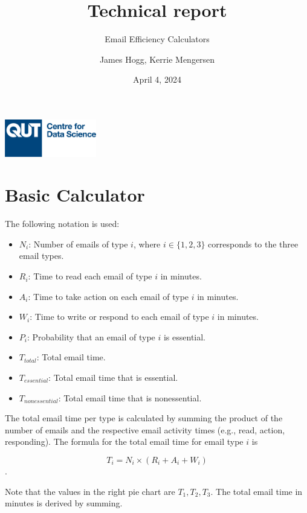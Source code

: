 \documentclass[
  reportpaper,
  DIV=11,
  numbers=noendperiod]{scrartcl}
\title{Technical report}
\subtitle{Email Efficiency Calculators}
\author{James Hogg, Kerrie Mengersen}
\date{April 4, 2024}
\providecommand{\tightlist}{%
  \setlength{\itemsep}{0pt}\setlength{\parskip}{0pt}}\usepackage{longtable,booktabs,array}
\begin{document}
\maketitle

\begin{center}
\includegraphics[width=0.3\textwidth]{../ed/static/ed/CDS-Logo-Blue.png}
\end{center}

\newpage{}

\section{Basic Calculator}\label{basic-calculator}

The following notation is used:

\begin{itemize}
\tightlist
\item
  \(N_i\): Number of emails of type \(i\), where \(i \in \{1,2,3\}\)
  corresponds to the three email types.
\item
  \(R_i\): Time to read each email of type \(i\) in minutes.
\item
  \(A_i\): Time to take action on each email of type \(i\) in minutes.
\item
  \(W_i\): Time to write or respond to each email of type \(i\) in
  minutes.
\item
  \(P_i\): Probability that an email of type \(i\) is essential.
\item
  \(T_{total}\): Total email time.
\item
  \(T_{essential}\): Total email time that is essential.
\item
  \(T_{nonessential}\): Total email time that is nonessential.
\end{itemize}

The total email time per type is calculated by summing the product of
the number of emails and the respective email activity times (e.g.,
read, action, responding). The formula for the total email time for
email type \(i\) is

\[ T_i = N_i \times (R_i + A_i + W_i) \].

Note that the values in the right pie chart are \(T_1,T_2,T_3\). The
total email time in minutes is derived by summing.
\end{document}
